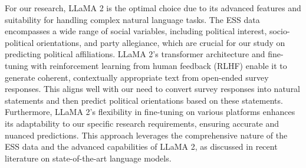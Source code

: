 For our research, LLaMA 2 is the optimal choice due to its advanced features and suitability for handling complex natural language tasks. The ESS data encompasses a wide range of social variables, including political interest, socio-political orientations, and party allegiance, which are crucial for our study on predicting political affiliations. LLaMA 2's transformer architecture and fine-tuning with reinforcement learning from human feedback (RLHF) enable it to generate coherent, contextually appropriate text from open-ended survey responses. This aligns well with our need to convert survey responses into natural statements and then predict political orientations based on these statements. Furthermore, LLaMA 2's flexibility in fine-tuning on various platforms enhances its adaptability to our specific research requirements, ensuring accurate and nuanced predictions. This approach leverages the comprehensive nature of the ESS data and the advanced capabilities of LLaMA 2, as discussed in recent literature on state-of-the-art language models.